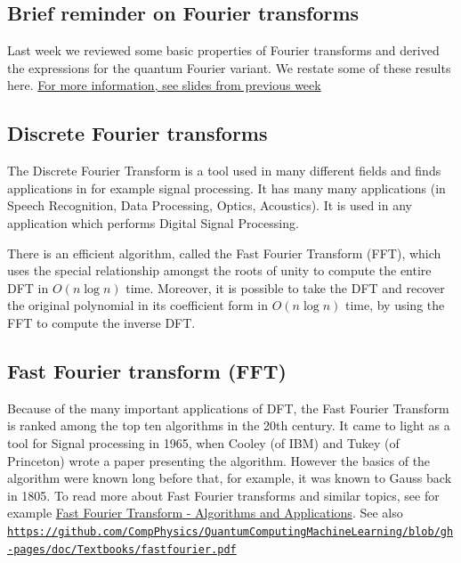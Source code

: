 \documentclass[%
oneside,                 %
final,                   %
10pt]{article}
\begin{document}
\subsection{Brief reminder on Fourier transforms}

Last week we reviewed some basic properties of Fourier transforms and derived the expressions for the quantum Fourier variant.
We restate some of these results here.
\href{{https://github.com/CompPhysics/QuantumComputingMachineLearning/blob/gh-pages/doc/pub/week10/ipynb/week10.ipynb}}{For more information, see slides from previous week}

\subsection{Discrete Fourier transforms}

The Discrete Fourier Transform is a tool used in many different fields
and finds applications in for example signal processing.  It has many
many applications (in Speech Recognition, Data Processing, Optics,
Acoustics). It is used in any application which performs Digital
Signal Processing.

There
is an efficient algorithm, called the Fast Fourier Transform (FFT),
which uses the special relationship amongst the roots of unity to
compute the entire DFT in $O(n \log{n})$ time. Moreover, it is possible to take the DFT and recover the original
polynomial in its coefficient form in $O(n \log{n})$ time, by using the
FFT to compute the inverse DFT.

\subsection{Fast Fourier transform (FFT)}

Because of the many important applications of DFT, the Fast Fourier
Transform is ranked among the top ten  algorithms in the 20th century.
It came to light as a tool for Signal processing in 1965, when
Cooley (of IBM) and Tukey (of Princeton) wrote a paper presenting the
algorithm. However the basics of the algorithm were known long before
that, for example, it was known to Gauss back in 1805.
To read more about Fast Fourier transforms and similar topics, see for example \href{{https://link.springer.com/book/10.1007/978-1-4020-6629-0}}{Fast Fourier Transform - Algorithms and Applications}. See also \href{{https://github.com/CompPhysics/QuantumComputingMachineLearning/blob/gh-pages/doc/Textbooks/fastfourier.pdf}}{\nolinkurl{https://github.com/CompPhysics/QuantumComputingMachineLearning/blob/gh-pages/doc/Textbooks/fastfourier.pdf}}
\end{document}
